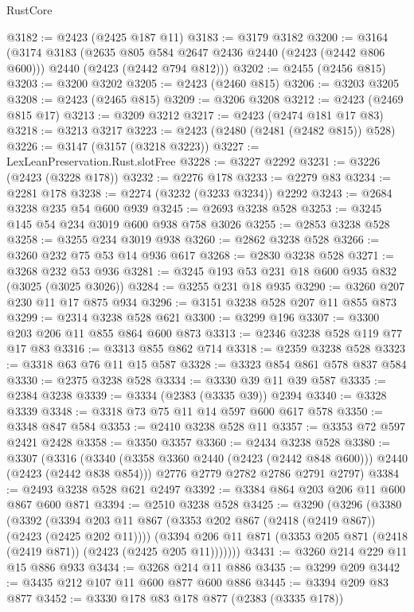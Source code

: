 \begin{lexlean}{RustCore}
\begin{coremodule}
@3182 := @2423 (@2425 @187 @11)
@3183 := @3179 @3182
@3200 := @3164
    (@3174
      @3183
      (@2635 @805 @584 @2647 @2436 @2440 (@2423 (@2442 @806 @600)))
      @2440
      (@2423 (@2442 @794 @812)))
@3202 := @2455 (@2456 @815)
@3203 := @3200 @3202
@3205 := @2423 (@2460 @815)
@3206 := @3203 @3205
@3208 := @2423 (@2465 @815)
@3209 := @3206 @3208
@3212 := @2423 (@2469 @815 @17)
@3213 := @3209 @3212
@3217 := @2423 (@2474 @181 @17 @83)
@3218 := @3213 @3217
@3223 := @2423 (@2480 (@2481 (@2482 @815)) @528)
@3226 := @3147 (@3157 (@3218 @3223))
@3227 := LexLeanPreservation.Rust.slotFree
@3228 := @3227 @2292
@3231 := @3226 (@2423 (@3228 @178))
@3232 := @2276 @178
@3233 := @2279 @83
@3234 := @2281 @178
@3238 := @2274 (@3232 (@3233 @3234)) @2292
@3243 := @2684 @3238 @235 @54 @600 @939
@3245 := @2693 @3238 @528
@3253 := @3245 @145 @54 @234 @3019 @600 @938 @758 @3026
@3255 := @2853 @3238 @528
@3258 := @3255 @234 @3019 @938
@3260 := @2862 @3238 @528
@3266 := @3260 @232 @75 @53 @14 @936 @617
@3268 := @2830 @3238 @528
@3271 := @3268 @232 @53 @936
@3281 := @3245 @193 @53 @231 @18 @600 @935 @832 (@3025 (@3025 @3026))
@3284 := @3255 @231 @18 @935
@3290 := @3260 @207 @230 @11 @17 @875 @934
@3296 := @3151 @3238 @528 @207 @11 @855 @873
@3299 := @2314 @3238 @528 @621
@3300 := @3299 @196
@3307 := @3300 @203 @206 @11 @855 @864 @600 @873
@3313 := @2346 @3238 @528 @119 @77 @17 @83
@3316 := @3313 @855 @862 @714
@3318 := @2359 @3238 @528
@3323 := @3318 @63 @76 @11 @15 @587
@3328 := @3323 @854 @861 @578 @837 @584
@3330 := @2375 @3238 @528
@3334 := @3330 @39 @11 @39 @587
@3335 := @2384 @3238
@3339 := @3334 (@2383 (@3335 @39)) @2394
@3340 := @3328 @3339
@3348 := @3318 @73 @75 @11 @14 @597 @600 @617 @578
@3350 := @3348 @847 @584
@3353 := @2410 @3238 @528 @11
@3357 := @3353 @72 @597 @2421 @2428
@3358 := @3350 @3357
@3360 := @2434 @3238 @528
@3380 := @3307
    (@3316
      (@3340 (@3358 @3360 @2440 (@2423 (@2442 @848 @600))) @2440 (@2423 (@2442 @838 @854)))
      @2776
      @2779
      @2782
      @2786
      @2791
      @2797)
@3384 := @2493 @3238 @528 @621 @2497
@3392 := @3384 @864 @203 @206 @11 @600 @867 @600 @871
@3394 := @2510 @3238 @528
@3425 := @3290
    (@3296
      (@3380
        (@3392
          (@3394 @203 @11 @867 (@3353 @202 @867 (@2418 (@2419 @867)) (@2423 (@2425 @202 @11))))
          (@3394 @206 @11 @871 (@3353 @205 @871 (@2418 (@2419 @871)) (@2423 (@2425 @205 @11)))))))
@3431 := @3260 @214 @229 @11 @15 @886 @933
@3434 := @3268 @214 @11 @886
@3435 := @3299 @209
@3442 := @3435 @212 @107 @11 @600 @877 @600 @886
@3445 := @3394 @209 @83 @877
@3452 := @3330 @178 @83 @178 @877 (@2383 (@3335 @178))

\end{coremodule}
\end{lexlean}
